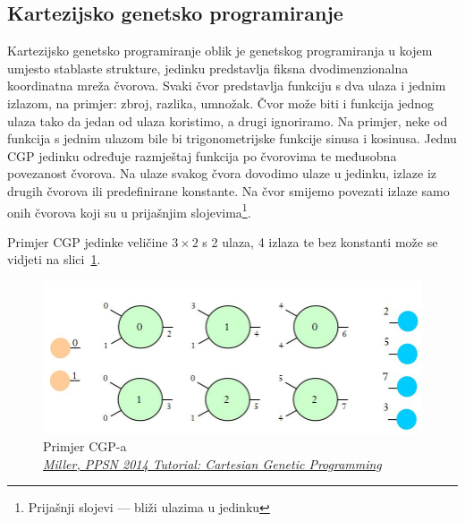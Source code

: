 \documentclass[times, utf8, zavrsni, numeric]{fer}
\begin{document}
\subsection{Kartezijsko genetsko programiranje}
Kartezijsko genetsko programiranje  oblik je
genetskog programiranja u kojem umjesto stablaste strukture, jedinku predstavlja
fiksna dvodimenzionalna koordinatna mreža čvorova. Svaki čvor predstavlja
funkciju s dva ulaza i jednim izlazom, na primjer: zbroj, razlika, umnožak. Čvor
može biti i funkcija jednog ulaza tako da jedan od ulaza koristimo, a drugi
ignoriramo.  Na primjer, neke od funkcija s jednim ulazom bile bi
trigonometrijske funkcije sinusa i kosinusa. Jednu CGP jedinku određuje
razmještaj funkcija po čvorovima te međusobna povezanost čvorova. Na ulaze
svakog čvora dovodimo ulaze u jedinku, izlaze iz drugih čvorova ili
predefinirane konstante. Na čvor smijemo povezati izlaze samo onih čvorova koji
su u prijašnjim slojevima\footnote{Prijašnji slojevi --- bliži ulazima u
jedinku}.

Primjer CGP jedinke veličine $3\times2$ s 2 ulaza, 4 izlaza te bez konstanti
može se vidjeti na slici~\ref{fig:cgp}.

\begin{figure}[h] 
    \centering
    \includegraphics[width=15cm]{img/cgp}
    \caption{Primjer CGP-a\\ \textsl{\scriptsize
    \href{http://ppsn2014.ijs.si/files/slides/ppsn2014-tutorial3-miller.pdf}{Miller,
    PPSN 2014 Tutorial: Cartesian Genetic Programming}}}\label{fig:cgp}
\end{figure}
\end{document}
